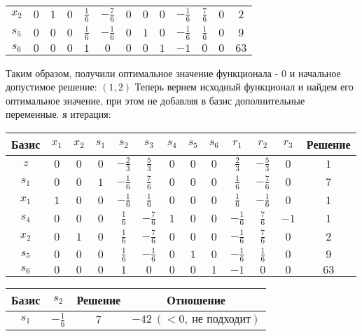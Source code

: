 \documentclass{article}%
\begin{document}
\begin{flushleft}
\begin{tabular}{|c|ccccccccccc|c|}
$x_{2}$&$0$&$1$&$0$&$\frac{1}{6}$&$-\frac{7}{6}$&$0$&$0$&$0$&$-\frac{1}{6}$&$\frac{7}{6}$&$0$&$2$\\%
$s_{5}$&$0$&$0$&$0$&$\frac{1}{6}$&$-\frac{1}{6}$&$0$&$1$&$0$&$-\frac{1}{6}$&$\frac{1}{6}$&$0$&$9$\\%
$s_{6}$&$0$&$0$&$0$&$1$&$0$&$0$&$0$&$1$&$-1$&$0$&$0$&$63$\\%
\hline%
\end{tabular}%
\newline%
\newline%
Таким образом, получили оптимальное значение функционала {-} 0 и начальное допустимое решение: %
$(1, 2)$%
\newline%
Теперь вернем исходный функционал и найдем его оптимальное значение, при этом не добавляя в базис дополнительные переменные.%
я итерация: %
\newline%
\newline%
\renewcommand{\arraystretch}{1.3}%
\begin{tabular}{|c|ccccccccccc|c|}%
\hline%
Базис&$x_{1}$&$x_{2}$&$s_{1}$&$s_{2}$&$s_{3}$&$s_{4}$&$s_{5}$&$s_{6}$&$r_{1}$&$r_{2}$&$r_{3}$&Решение\\%
\hline%
$z$&$0$&$0$&$0$&$-\frac{2}{3}$&$\frac{5}{3}$&$0$&$0$&$0$&$\frac{2}{3}$&$-\frac{5}{3}$&$0$&$1$\\%
\hline%
$s_{1}$&$0$&$0$&$1$&$-\frac{1}{6}$&$\frac{7}{6}$&$0$&$0$&$0$&$\frac{1}{6}$&$-\frac{7}{6}$&$0$&$7$\\%
$x_{1}$&$1$&$0$&$0$&$-\frac{1}{6}$&$\frac{1}{6}$&$0$&$0$&$0$&$\frac{1}{6}$&$-\frac{1}{6}$&$0$&$1$\\%
$s_{4}$&$0$&$0$&$0$&$\frac{1}{6}$&$-\frac{7}{6}$&$1$&$0$&$0$&$-\frac{1}{6}$&$\frac{7}{6}$&$-1$&$1$\\%
$x_{2}$&$0$&$1$&$0$&$\frac{1}{6}$&$-\frac{7}{6}$&$0$&$0$&$0$&$-\frac{1}{6}$&$\frac{7}{6}$&$0$&$2$\\%
$s_{5}$&$0$&$0$&$0$&$\frac{1}{6}$&$-\frac{1}{6}$&$0$&$1$&$0$&$-\frac{1}{6}$&$\frac{1}{6}$&$0$&$9$\\%
$s_{6}$&$0$&$0$&$0$&$1$&$0$&$0$&$0$&$1$&$-1$&$0$&$0$&$63$\\%
\hline%
\end{tabular}%
\newline%
\newline%
\newline%
\begin{tabular}{|cccc|}%
\hline%
Базис&$s_{2}$&Решение&Отношение\\%
\hline%
$s_{1}$&$-\frac{1}{6}$&$7$&$-42\: (< 0, \: \text{не подходит})$\\%

\end{tabular}
\end{flushleft}
\end{document}
